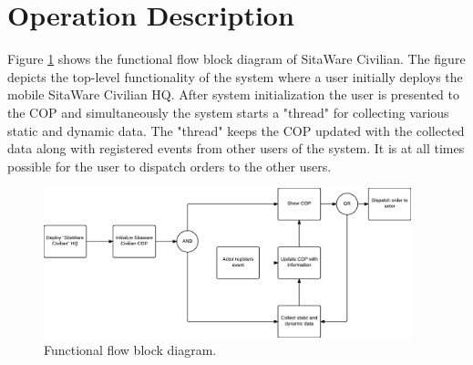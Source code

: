\section{Operation Description}

Figure \ref{fig:functional_flow_block_diagram} shows the functional flow block diagram of SitaWare Civilian. The figure depicts the top-level functionality of the system where a user initially deploys the mobile SitaWare Civilian HQ. After system initialization the user is presented to the COP and simultaneously the system starts a "thread" for collecting various static and dynamic data. The "thread" keeps the COP updated with the collected data along with registered events from other users of the system. It is at all times possible for the user to dispatch orders to the other users. 

\begin{figure}[H]
\centering
\includegraphics[width=0.95\textwidth]
{billeder/functional_flow_block_diagram.pdf}
\caption{Functional flow block diagram.}
\label{fig:functional_flow_block_diagram}
\end{figure}